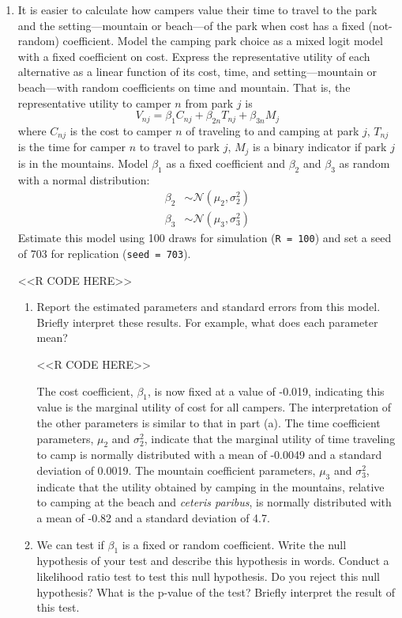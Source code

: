 \documentclass[11pt,letterpaper]{article}
\begin{document}
\begin{enumerate}[label=\alph*., leftmargin=*]
	\item It is easier to calculate how campers value their time to travel to the park and the setting---mountain or beach---of the park when cost has a fixed (not-random) coefficient. Model the camping park choice as a mixed logit model with a fixed coefficient on cost. Express the representative utility of each alternative as a linear function of its cost, time, and setting---mountain or beach---with random coefficients on time and mountain. That is, the representative utility to camper $n$ from park $j$ is
	$$V_{nj} = \beta_1 C_{nj} + \beta_{2n} T_{nj} + \beta_{3n} M_j$$
	where $C_{nj}$ is the cost to camper $n$ of traveling to and camping at park $j$, $T_{nj}$ is the time for camper $n$ to travel to park $j$, $M_j$ is a binary indicator if park $j$ is in the mountains. Model $\beta_1$ as a fixed coefficient and $\beta_2$ and $\beta_3$ as random with a normal distribution:
	\begin{align*}
		\beta_2 & \sim \mathcal{N}(\mu_2, \sigma_2^2) \\
		\beta_3 & \sim \mathcal{N}(\mu_3, \sigma_3^2)
	\end{align*}
	Estimate this model using 100 draws for simulation (\texttt{R = 100}) and set a seed of 703 for replication (\texttt{seed = 703}).

	<<R CODE HERE>>

	\begin{enumerate}[label=\roman*.]
		\item Report the estimated parameters and standard errors from this model. Briefly interpret these results. For example, what does each parameter mean?

		<<R CODE HERE>>

		The cost coefficient, $\beta_1$, is now fixed at a value of -0.019, indicating this value is the marginal utility of cost for all campers. The interpretation of the other parameters is similar to that in part (a). The time coefficient parameters, $\mu_2$ and $\sigma_2^2$, indicate that the marginal utility of time traveling to camp is normally distributed with a mean of -0.0049 and a standard deviation of 0.0019. The mountain coefficient parameters, $\mu_3$ and $\sigma_3^2$, indicate that the utility obtained by camping in the mountains, relative to camping at the beach and \emph{ceteris paribus}, is normally distributed with a mean of -0.82 and a standard deviation of 4.7.

		\item We can test if $\beta_1$ is a fixed or random coefficient. Write the null hypothesis of your test and describe this hypothesis in words. Conduct a likelihood ratio test to test this null hypothesis. Do you reject this null hypothesis? What is the p-value of the test? Briefly interpret the result of this test.


\end{enumerate}
\end{enumerate}
\end{document}
